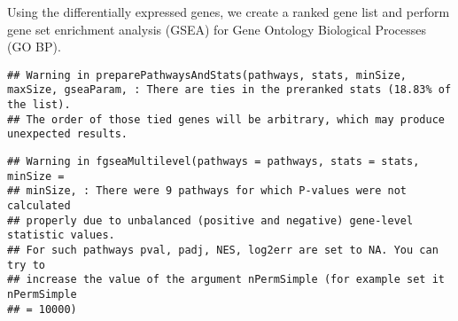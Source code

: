 \documentclass[
]{article}
\newenvironment{Shaded}{\begin{snugshade}}{\end{snugshade}}
\newcommand{\AttributeTok}[1]{\textcolor[rgb]{0.13,0.29,0.53}{#1}}
\newcommand{\CommentTok}[1]{\textcolor[rgb]{0.56,0.35,0.01}{\textit{#1}}}
\newcommand{\ConstantTok}[1]{\textcolor[rgb]{0.56,0.35,0.01}{#1}}
\newcommand{\DecValTok}[1]{\textcolor[rgb]{0.00,0.00,0.81}{#1}}
\newcommand{\FloatTok}[1]{\textcolor[rgb]{0.00,0.00,0.81}{#1}}
\newcommand{\FunctionTok}[1]{\textcolor[rgb]{0.13,0.29,0.53}{\textbf{#1}}}
\newcommand{\NormalTok}[1]{#1}
\newcommand{\OtherTok}[1]{\textcolor[rgb]{0.56,0.35,0.01}{#1}}
\newcommand{\SpecialCharTok}[1]{\textcolor[rgb]{0.81,0.36,0.00}{\textbf{#1}}}
\newcommand{\StringTok}[1]{\textcolor[rgb]{0.31,0.60,0.02}{#1}}
\begin{document}
Using the differentially expressed genes, we create a ranked gene list
and perform gene set enrichment analysis (GSEA) for Gene Ontology
Biological Processes (GO BP).

\begin{Shaded}
\end{Shaded}

\begin{verbatim}
## Warning in preparePathwaysAndStats(pathways, stats, minSize, maxSize, gseaParam, : There are ties in the preranked stats (18.83% of the list).
## The order of those tied genes will be arbitrary, which may produce unexpected results.
\end{verbatim}

\begin{verbatim}
## Warning in fgseaMultilevel(pathways = pathways, stats = stats, minSize =
## minSize, : There were 9 pathways for which P-values were not calculated
## properly due to unbalanced (positive and negative) gene-level statistic values.
## For such pathways pval, padj, NES, log2err are set to NA. You can try to
## increase the value of the argument nPermSimple (for example set it nPermSimple
## = 10000)
\end{verbatim}
\end{document}
